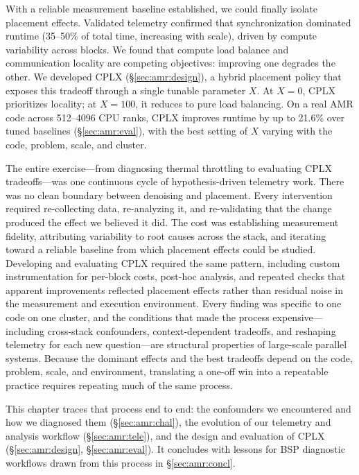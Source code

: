 With a reliable measurement baseline established, we could finally isolate placement effects.
Validated telemetry confirmed that synchronization dominated runtime (35--50\% of total time,
increasing with scale), driven by compute variability across blocks.
We found that compute load balance and communication locality are competing objectives: improving
one degrades the other.
We developed CPLX (\S\ref{sec:amr:design}), a hybrid placement policy that exposes this tradeoff
through a single tunable parameter $X$.
At $X{=}0$, CPLX prioritizes locality; at $X{=}100$, it reduces to pure load balancing.
On a real AMR code across 512--4096 CPU ranks, CPLX improves runtime by up to 21.6\% over tuned
baselines (\S\ref{sec:amr:eval}), with the best setting of $X$ varying with the code, problem,
scale, and cluster.

The entire exercise---from diagnosing thermal throttling to evaluating CPLX tradeoffs---was one
continuous cycle of hypothesis-driven telemetry work.
There was no clean boundary between denoising and placement.
Every intervention required re-collecting data, re-analyzing it, and re-validating that the change
produced the effect we believed it did.
The cost was establishing measurement fidelity, attributing variability to root causes across the
stack, and iterating toward a reliable baseline from which placement effects could be studied.
Developing and evaluating CPLX required the same pattern, including custom instrumentation for
per-block costs, post-hoc analysis, and repeated checks that apparent improvements reflected
placement effects rather than residual noise in the measurement and execution environment.
Every finding was specific to one code on one cluster, and the conditions that made the process
expensive---including cross-stack confounders, context-dependent tradeoffs, and reshaping telemetry
for each new question---are structural properties of large-scale parallel systems.
Because the dominant effects and the best tradeoffs depend on the code, problem, scale, and
environment, translating a one-off win into a repeatable practice requires repeating much of the
same process.

This chapter traces that process end to end: the confounders we encountered and how we diagnosed
them (\S\ref{sec:amr:chal}), the evolution of our telemetry and analysis workflow
(\S\ref{sec:amr:tele}), and the design and evaluation of CPLX
(\S\ref{sec:amr:design}, \S\ref{sec:amr:eval}).
It concludes with lessons for BSP diagnostic workflows drawn from this process in \S\ref{sec:amr:concl}.

